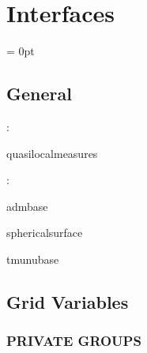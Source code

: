 
\section{Interfaces} 


\parskip = 0pt

\vspace{3mm} \subsection*{General}

: 

quasilocalmeasures
\vspace{2mm}

: 

admbase

sphericalsurface

tmunubase
\vspace{2mm}
\subsection*{Grid Variables}
\vspace{5mm}\subsubsection{PRIVATE GROUPS}

\vspace{5mm}

